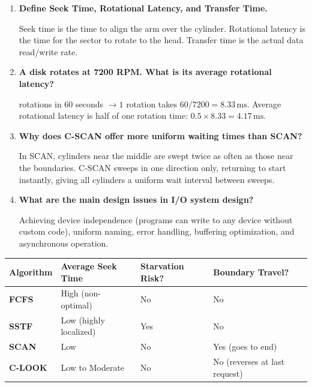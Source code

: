 \documentclass[12pt,a4paper]{article}
\newcommand{\Q}[1]{\textbf{#1}\par\noindent\ignorespaces}
\renewcommand{\arraystretch}{1.45}
\begin{document}
\begin{tcolorbox}[exambox, title={\textbf{Frequently Asked / Viva Questions}}]
\begin{enumerate}[topsep=0pt, label=\textbf{Q\arabic*.}, itemsep=5pt]
  \item \Q{Define Seek Time, Rotational Latency, and Transfer Time.}
    Seek time is the time to align the arm over the cylinder. Rotational latency is the time for the sector to rotate to the head. Transfer time is the actual data read/write rate.
  \item \Q{A disk rotates at 7200 RPM. What is its average rotational latency?}
    7200 rotations in 60 seconds $\to 1$ rotation takes $60 / 7200 = 8.33\,\text{ms}$. Average rotational latency is half of one rotation time: $0.5 \times 8.33 = 4.17\,\text{ms}$.
  \item \Q{Why does C-SCAN offer more uniform waiting times than SCAN?}
    In SCAN, cylinders near the middle are swept twice as often as those near the boundaries. C-SCAN sweeps in one direction only, returning to start instantly, giving all cylinders a uniform wait interval between sweeps.
  \item \Q{What are the main design issues in I/O system design?}
    Achieving device independence (programs can write to any device without custom code), uniform naming, error handling, buffering optimization, and asynchronous operation.
\end{enumerate}
\end{tcolorbox}

\begin{tcolorbox}[tikzbox, title={Disk Scheduling Algorithms Comparison}]
\renewcommand{\arraystretch}{1.4}
\par\noindent
\begin{tabularx}{\linewidth}{|B{2.2cm}|>{\small\centering\arraybackslash}X|>{\small\centering\arraybackslash}X|>{\small\centering\arraybackslash}X|}
\hline
\textbf{Algorithm} & \textbf{\color{myred}Average Seek Time} & \textbf{\color{myteal}Starvation Risk?} & \textbf{\color{myamber}Boundary Travel?} \\
\hline
\textbf{FCFS} & High (non-optimal) & No & No \\
\hline
\textbf{SSTF} & Low (highly localized) & Yes & No \\
\hline
\textbf{SCAN} & Low & No & Yes (goes to end) \\
\hline
\textbf{C-LOOK} & Low to Moderate & No & No (reverses at last request) \\
\hline
\end{tabularx}
\end{tcolorbox}
\end{document}
